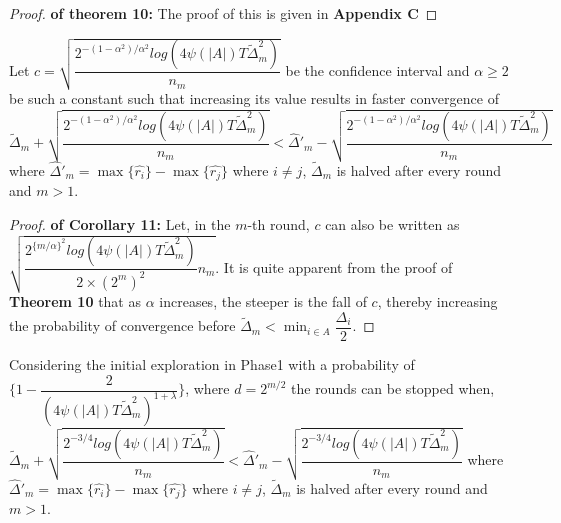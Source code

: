 \begin{proof}\textbf{ of theorem 10:}
The proof of this is given in \textbf{Appendix C}
\end{proof}

\begin{corollary}
Let $c=\sqrt{\dfrac{2^{-(1-\alpha^{2})/\alpha^{2}} log({4\psi(|A|)T\tilde{\Delta}_{m}^{2}})}{n_{m}}}$ be the confidence interval and $\alpha \geq 2$ be such a constant such that increasing its value results in faster convergence of $\tilde{\Delta}_{m} + \sqrt{\dfrac{2^{-(1-\alpha^{2})/\alpha^{2}} log({4\psi(|A|)T\tilde{\Delta}_{m}^{2}})}{n_{m}}} < \hat{\Delta}'_{m} - \sqrt{\dfrac{2^{-(1-\alpha^{2})/\alpha^{2}} log({4\psi(|A|)T\tilde{\Delta}_{m}^{2}})}{n_{m}}}$ where $\hat{\Delta}'_{m}=\max\lbrace\hat{r_{i}}\rbrace-\max\lbrace\hat{r_{j}}\rbrace$ where $i\neq j $, $\tilde{\Delta}_{m}$ is halved after every round and $m>1$.
\end{corollary}

\begin{proof}\textbf{ of Corollary 11:}
Let, in the $m$-th round, $c$ can also be written as $\sqrt{\dfrac{2^{\lbrace m/\alpha \rbrace^{2}} log({4\psi(|A|)T\tilde{\Delta}_{m}^{2}})}{2\times(2^{m})^2}n_{m}}$. It is quite apparent from the  proof  of \textbf{Theorem 10} that as $\alpha$ increases, the steeper is the fall of $c$, thereby increasing the probability of convergence before $\tilde{\Delta}_{m} < \min_{i\in A}\dfrac{{\Delta_{i}}}{2}$.
\end{proof}

\begin{corollary}
Considering the initial exploration in Phase1 with a probability of $\bigg\lbrace 1-\dfrac{2}{(4\psi(|A|)T\tilde{\Delta}_{m}^{2})^{1+\lambda}}\bigg\rbrace$, where $d=2^{m/2}$ the rounds can be stopped  when, $\tilde{\Delta}_{m} + \sqrt{\dfrac{2^{-3/4} log({4\psi(|A|)T\tilde{\Delta}_{m}^{2}})}{n_{m}}} < \hat{\Delta}'_{m} - \sqrt{\dfrac{2^{-3/4} log({4\psi(|A|)T\tilde{\Delta}_{m}^{2}})}{n_{m}}}$ where $\hat{\Delta}'_{m}=\max\lbrace\hat{r_{i}}\rbrace-\max\lbrace\hat{r_{j}}\rbrace$ where $i\neq j $, $\tilde{\Delta}_{m}$ is halved after every round and $m>1$.
\end{corollary}

